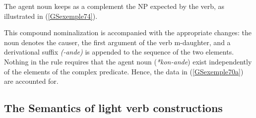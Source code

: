 \documentclass[output=paper
                ,modfonts
                ,nonflat
	        ,collection
	        ,collectionchapter
	        ,collectiontoclongg
 	        ,biblatex
                ,babelshorthands
                ,newtxmath
                ,draftmode
                ,colorlinks, citecolor=brown
]{./langsci/langscibook}
\begin{document}
{\begin{exe}
\end{exe}

The agent noun keeps as a complement the NP expected by the verb, as illustrated in (\ref{GSexemple74}).   

\begin{exe}
	\label{GSexemple74}

\end{exe}

This compound nominalization is accompanied with the appropriate changes: the noun denotes the causer, the first argument of the verb m-daughter, and a derivational suffix \emph{(-ande)} is appended to the sequence of the two elements. Nothing in the rule requires that the agent noun (\emph{*kon-ande}) exist independently of the elements of the complex predicate. Hence, the data in (\ref{GSexemple70a}) are accounted for.

\subsection{The Semantics of light verb constructions}\label{GSsection5.3}

}
\end{document}
